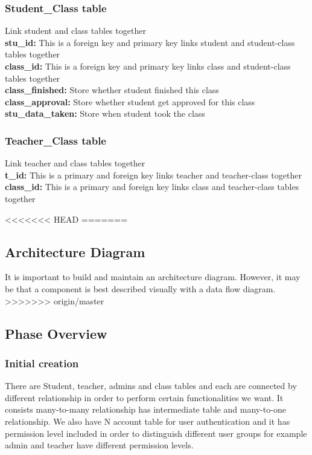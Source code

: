 \subsubsection{Student\_Class table}
Link student and class tables together\\
\textbf{stu\_id:} This is a foreign key and primary key links student and student-class tables together\\
\textbf{class\_id:} This is a foreign key and primary key links class and student-class tables together\\
\textbf{class\_finished:} Store whether student finished this class\\
\textbf{class\_approval:} Store whether student get approved for this class\\
\textbf{stu\_data\_taken:} Store when student took the class
\subsubsection{Teacher\_Class table}
Link teacher and class tables together\\
\textbf{t\_id:} This is a primary and foreign key links teacher and teacher-class together\\
\textbf{class\_id:} This is a primary and foreign key links class and teacher-class tables together

<<<<<<< HEAD
=======
\subsection{ Architecture  Diagram}
It is important to build and maintain an architecture diagram.  However, it may 
be that a component is best described visually with a data flow diagram. 
>>>>>>> origin/master

\subsection{Phase Overview}

\subsubsection{Initial creation}
There are Student, teacher, admins and class tables and each are connected by different relationship in order to perform certain functionalities we want. It consists many-to-many relationship has intermediate table and many-to-one relationship. We also have N account table for user authentication and it has permission level included in order to distinguish different user groups for example admin and teacher have different permission levels.\\

